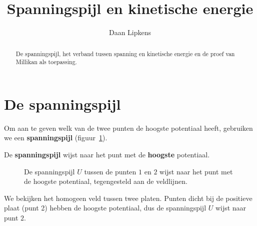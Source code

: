 \documentclass{ximera}
\title{Spanningspijl en kinetische energie}
\author{Daan Lipkens}
\begin{document}
\begin{abstract}
    De spanningspijl, het verband tussen spanning en kinetische energie en de proef van Millikan als toepassing.
\end{abstract}
\maketitle

\section{De spanningspijl}\label{sec:spanningspijl}
Om aan te geven welk van de twee punten de hoogste potentiaal heeft, gebruiken we een \textbf{spanningspijl} (figuur~\ref{fig:spanningspijl}).

\begin{definition}[foldable=true,title={Spanningspijl}]\nl
De \textbf{spanningspijl} wijst naar het punt met de \textbf{hoogste} potentiaal.
\end{definition}

\begin{figure}[h]
    \captionsetup{width=0.85\textwidth}
    \begin{center}
    \end{center}
    \caption{De spanningspijl $U$ tussen de punten $1$ en $2$ wijst naar het punt met de hoogste potentiaal, tegengesteld aan de veldlijnen.}
    \label{fig:spanningspijl}
\end{figure}

We bekijken het homogeen veld tussen twee platen. Punten dicht bij de positieve plaat (punt 2) hebben de hoogste potentiaal, dus de spanningspijl $U$ wijst naar punt $2$.
\end{document}

